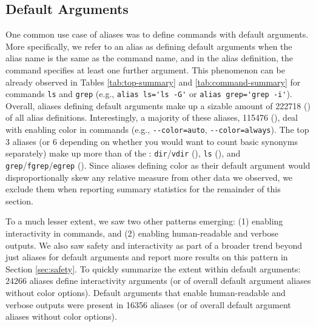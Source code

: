 \subsection{Default Arguments}

One common use case of aliases was to define commands with default arguments.
More specifically, we refer to an alias as defining default arguments when the alias name is the same as the command name, and in the alias definition, the command specifies at least one further argument.
This phenomenon can be already observed in Tables \ref{tab:top-summary} and \ref{tab:command-summary} for commands \verb|ls| and \verb|grep| (e.g., \verb|alias ls='ls -G'| or \verb|alias grep='grep -i'|).
Overall, aliases defining default arguments make up a sizable amount of \num{222718} () of all alias definitions. 
Interestingly, a majority of these aliases, \num{115476} (), deal with enabling color in commands (e.g., \verb|--color=auto|, \verb|--color=always|).
The top 3 aliases (or 6 depending on whether you would want to count basic synonyms separately) make up more than  of the : \verb|dir|/\verb|vdir| (), \verb|ls| (), and \verb|grep|/\verb|fgrep|/\verb|egrep| ().
Since aliases defining color as their default argument would disproportionally skew any relative measure from other data we observed, we exclude them when reporting summary statistics for the remainder of this section.

To a much lesser extent, we saw two other patterns emerging: (1) enabling interactivity in commands, and (2) enabling human-readable and verbose outputs.
We also saw safety and interactivity as part of a broader trend beyond just aliases for default arguments and report more results on this pattern in Section \ref{sec:safety}.
To quickly summarize the extent within default arguments: \num{24266} aliases define interactivity arguments (or  of overall default argument aliases without color options).
Default arguments that enable human-readable and verbose outputs were present in \num{16356} aliases (or  of overall default argument aliases without color options).

